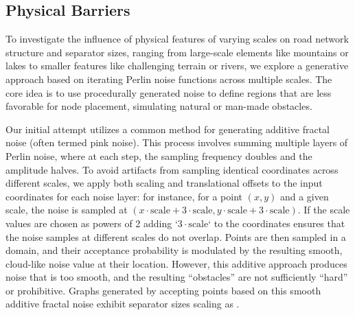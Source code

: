 



















\subsection{Physical Barriers}
\label{sec:synthetic:physical_barriers}

To investigate the influence of physical features of varying scales on road network structure and separator sizes, ranging from large-scale elements like mountains or lakes to smaller features like challenging terrain or rivers, we explore a generative approach based on iterating Perlin noise functions across multiple scales.
The core idea is to use procedurally generated noise to define regions that are less favorable for node placement, simulating natural or man-made obstacles.

Our initial attempt utilizes a common method for generating additive fractal noise (often termed pink noise).
This process involves summing multiple layers of Perlin noise, where at each step, the sampling frequency doubles and the amplitude halves.
To avoid artifacts from sampling identical coordinates across different scales, we apply both scaling and translational offsets to the input coordinates for each noise layer: for instance, for a point \((x,y)\) and a given scale, the noise is sampled at \((x \cdot \text{scale} + 3 \cdot \text{scale}, y \cdot \text{scale} + 3 \cdot \text{scale})\).
If the scale values are chosen as powers of 2 adding `\(3 \cdot \text{scale}\)` to the coordinates ensures that the noise samples at different scales do not overlap.
Points are then sampled in a domain, and their acceptance probability is modulated by the resulting smooth, cloud-like noise value at their location.
However, this additive approach produces noise that is too smooth, and the resulting \enquote{obstacles} are not sufficiently \enquote{hard} or prohibitive.
Graphs generated by accepting points based on this smooth additive fractal noise exhibit separator sizes scaling as .

